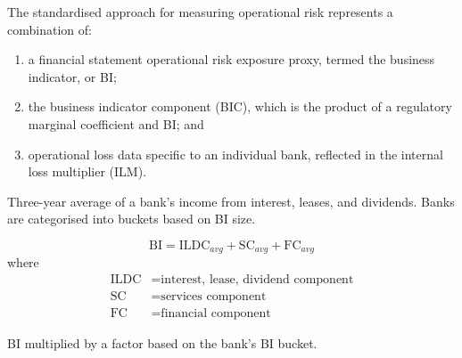 


The standardised approach for measuring operational risk represents a combination
of:

\begin{enumerate}
\item[\textcolor{rust}{\sffamily\bfseries (1)}] a financial statement operational
risk exposure proxy, termed the business indicator, or BI;
\item[\textcolor{rust}{\sffamily\bfseries (2)}] the business indicator component
(BIC), which is the product of a regulatory marginal coefficient and BI; and
\item[\textcolor{rust}{\sffamily\bfseries (3)}] operational loss data specific to
an individual bank, reflected in the internal loss multiplier (ILM).
\end{enumerate}


Three-year average of a bank's income from interest, leases, and dividends. Banks
are categorised into buckets based on BI size.

\begin{orkeybox}
\[
\mathrm{BI}=\mathrm{ILDC}_{avg}+\mathrm{SC}_{avg}+\mathrm{FC}_{avg}
\]
where
\[
\begin{aligned}
\mathrm{ILDC} &= \text{interest, lease, dividend component}\\
\mathrm{SC}   &= \text{services component}\\
\mathrm{FC}   &= \text{financial component}
\end{aligned}
\]
\end{orkeybox}


BI multiplied by a factor based on the bank's BI bucket.

